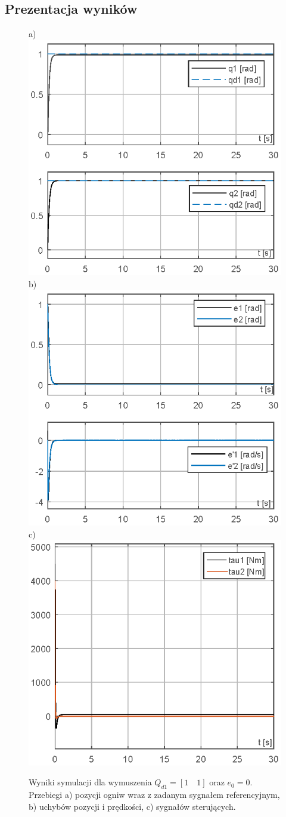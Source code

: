 \documentclass[10pt, a4paper, polish]{article}
\begin{document}
\subsection{Prezentacja wyników}
	\begin{figure}[H]\centering
	a) \includegraphics[width=0.30\columnwidth]{SRManCw5/SRManCw5_ZADANIE2/figs/01Pozycje_e0} b)\includegraphics[width=0.30\columnwidth]{SRManCw5/SRManCw5_ZADANIE2/figs/01Uchyby_e0} c)\includegraphics[width=0.30\columnwidth]{SRManCw5/SRManCw5_ZADANIE2/figs/01Sygnal_e0}\caption{
		Wyniki symulacji dla wymuszenia $Q_{d1}=[1\quad1]$ oraz $e_0=0$. Przebiegi a) pozycji ogniw wraz z zadanym sygnałem referencyjnym, b) uchybów pozycji i prędkości, c)  sygnałów sterujących.}
\end{figure}
\end{document}
